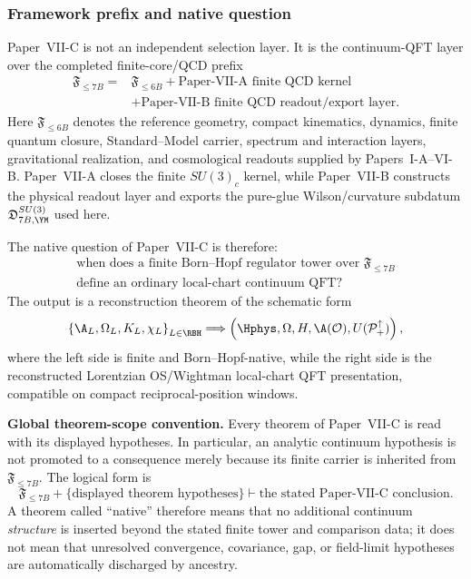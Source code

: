 \documentclass[12pt,a4paper]{article}
\begin{document}
\subsubsection{Framework prefix and native question}
\label{p12:sec:introduction-purpose}

Paper~VII-C is not an independent selection layer.  It is the continuum-QFT layer over the completed finite-core/QCD prefix
\begin{equation}
\label{p12:eq:framework-prefix}
\begin{aligned}
\mathfrak F_{\le 7B}
={}&\mathfrak F_{\le6B}
+\text{Paper-VII-A finite QCD kernel}\\
&+\text{Paper-VII-B finite QCD readout/export layer}.
\end{aligned}
\end{equation}
Here \(\mathfrak F_{\le6B}\) denotes the reference geometry, compact kinematics, dynamics, finite quantum closure, Standard--Model carrier, spectrum and interaction layers, gravitational realization, and cosmological readouts supplied by Papers~I-A--VI-B.  Paper~VII-A closes the finite \(SU(3)_c\) kernel, while Paper~VII-B constructs the physical readout layer and exports the pure-glue Wilson/curvature subdatum \(\mathfrak D_{7B,\YM}^{SU(3)}\) used here.

The native question of Paper~VII-C is therefore:
\[
\begin{gathered}
\text{when does a finite Born--Hopf regulator tower over }\mathfrak F_{\le7B}\\
\text{define an ordinary local-chart continuum QFT?}
\end{gathered}
\]
The output is a reconstruction theorem of the schematic form
\begin{equation}
\label{p12:eq:main-pipeline}
\left\{\A_L,\Omega_L,K_L,\chi_L\right\}_{L\in\RBH}
\Longrightarrow
\left(\Hphys,\Omega,H,\A(\mathcal O),U(\mathcal P_+^\uparrow)\right),
\end{equation}
where the left side is finite and Born--Hopf-native, while the right side is the reconstructed Lorentzian OS/Wightman local-chart QFT presentation, compatible on compact reciprocal-position windows.

\textbf{Global theorem-scope convention.}
Every theorem of Paper~VII-C is read with its displayed hypotheses.  In particular, an analytic continuum hypothesis is not promoted to a consequence merely because its finite carrier is inherited from \(\mathfrak F_{\le7B}\).  The logical form is
\begin{equation}
\label{p12:eq:global-theorem-scope}
\mathfrak F_{\le7B}+\{\text{displayed theorem hypotheses}\}
\vdash\text{the stated Paper-VII-C conclusion}.
\end{equation}
A theorem called ``native'' therefore means that no additional continuum \emph{structure} is inserted beyond the stated finite tower and comparison data; it does not mean that unresolved convergence, covariance, gap, or field-limit hypotheses are automatically discharged by ancestry.
\end{document}
